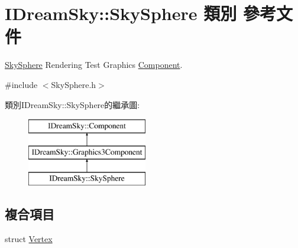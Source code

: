 \hypertarget{class_i_dream_sky_1_1_sky_sphere}{}\section{I\+Dream\+Sky\+:\+:Sky\+Sphere 類別 參考文件}
\label{class_i_dream_sky_1_1_sky_sphere}


\hyperlink{class_i_dream_sky_1_1_sky_sphere}{Sky\+Sphere} Rendering Test Graphics \hyperlink{class_i_dream_sky_1_1_component}{Component}.  




{\ttfamily \#include $<$Sky\+Sphere.\+h$>$}

類別\+I\+Dream\+Sky\+:\+:Sky\+Sphere的繼承圖\+:\begin{figure}[H]
\begin{center}
\leavevmode
\includegraphics[height=3.000000cm]{class_i_dream_sky_1_1_sky_sphere}
\end{center}
\end{figure}
\subsection*{複合項目}
\begin{DoxyCompactItemize}
\item 
struct \hyperlink{struct_i_dream_sky_1_1_sky_sphere_1_1_vertex}{Vertex}
\end{DoxyCompactItemize}
